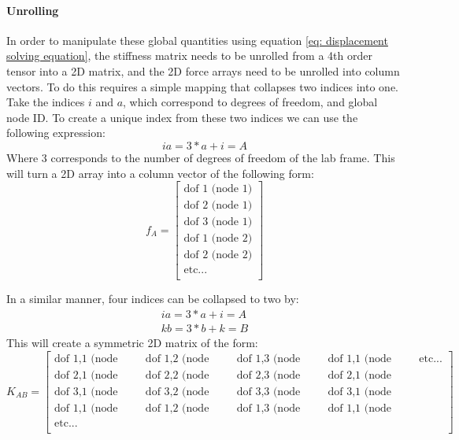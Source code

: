 \documentclass[]{spie}  %
\begin{document}
\paragraph{Unrolling}
In order to manipulate these global quantities using equation \ref{eq: displacement solving equation}, the stiffness matrix needs to be unrolled from a 4th order tensor into a 2D matrix, and the 2D force arrays need to be unrolled into column vectors. To do this requires a simple mapping that collapses two indices into one. Take the indices $i$ and $a$, which correspond to degrees of freedom, and global node ID. To create a unique index from these two indices we can use the following expression:
\begin{equation}
\label{eq: unrolling}
ia = 3 * a + i = A
\end{equation}
Where 3 corresponds to the number of degrees of freedom of the lab frame. This will turn a 2D array into a column vector of the following form:
\begin{equation}
\label{eq: global force array}
f_A =
\begin{bmatrix}
	\textrm{dof 1 (node 1)}	 \\
	\textrm{dof 2 (node 1)}	 \\
	\textrm{dof 3 (node 1)}	\\
	\textrm{dof 1 (node 2)}	\\
	\textrm{dof 2 (node 2)}	\\
	\textrm{etc...}	\\
\end{bmatrix}
\end{equation}

In a similar manner, four indices can be collapsed to two by:
\begin{gather}
\label{eq: unrolling 2}
ia = 3 * a + i = A \\
kb = 3 * b + k = B
\end{gather}
This will create a symmetric 2D matrix of the form:
\begin{equation}
\label{eq: global stiffness matrix}
K_{AB} =
\begin{bmatrix}
\textrm{dof 1,1 (node 1,1)}	 & \textrm{dof 1,2 (node 1,1)} & \textrm{dof 1,3 (node 1,1)}& \textrm{dof 1,1 (node 1,2)}&\textrm{etc...}\\
\textrm{dof 2,1 (node 1,1)}	 & \textrm{dof 2,2 (node 1,1)} & \textrm{dof 2,3 (node 1,1)}& \textrm{dof 2,1 (node 1,2)}\\
\textrm{dof 3,1 (node 1,1)}	 & \textrm{dof 3,2 (node 1,1)} & \textrm{dof 3,3 (node 1,1)}& \textrm{dof 3,1 (node 1,2)}\\
\textrm{dof 1,1 (node 2,1)}	 & \textrm{dof 1,2 (node 2,1)} & \textrm{dof 1,3 (node 2,1)}& \textrm{dof 1,1 (node 2,2)}\\
\textrm{etc...}	&&&&\\
\end{bmatrix}
\end{equation}
\end{document}
